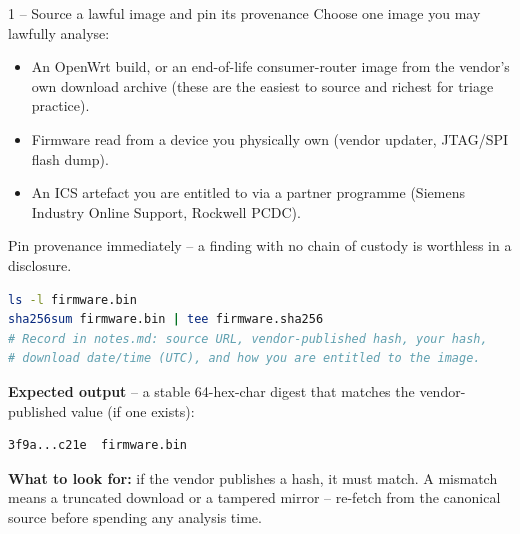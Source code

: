 \documentclass[11pt,a4paper]{article}
\begin{document}
\begin{stepbox}{1 -- Source a lawful image and pin its provenance}
Choose one image you may lawfully analyse:
\begin{itemize}\setlength{\itemsep}{1pt}
  \item An OpenWrt build, or an end-of-life consumer-router image from
        the vendor's own download archive (these are the easiest to
        source and richest for triage practice).
  \item Firmware read from a device you physically own (vendor
        updater, JTAG/SPI flash dump).
  \item An ICS artefact you are entitled to via a partner programme
        (Siemens Industry Online Support, Rockwell PCDC).
\end{itemize}
Pin provenance immediately -- a finding with no chain of custody is
worthless in a disclosure.

\begin{lstlisting}[language=bash]
ls -l firmware.bin
sha256sum firmware.bin | tee firmware.sha256
# Record in notes.md: source URL, vendor-published hash, your hash,
# download date/time (UTC), and how you are entitled to the image.
\end{lstlisting}

\textbf{Expected output} -- a stable 64-hex-char digest that matches
the vendor-published value (if one exists):

\begin{lstlisting}
3f9a...c21e  firmware.bin
\end{lstlisting}

\textbf{What to look for:} if the vendor publishes a hash, it must
match. A mismatch means a truncated download or a tampered mirror --
re-fetch from the canonical source before spending any analysis time.
\end{stepbox}
\end{document}

